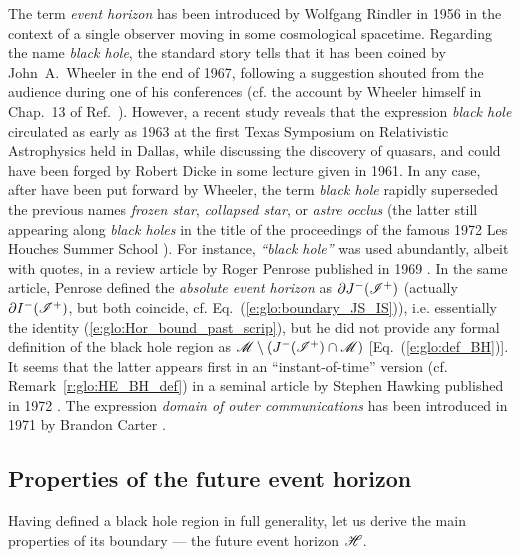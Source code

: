 \begin{hist} \label{h:glo:black_hole_name}
The term \emph{event horizon} has been introduced by Wolfgang Rindler in 1956 \cite{Rindl56}
in the context of a single observer moving in some cosmological spacetime.
Regarding the name \emph{black hole}, the standard
story tells that it has been coined by John~A.~Wheeler in the end of 1967,
following a suggestion shouted from the audience during one of his conferences
(cf. the account by Wheeler himself in Chap.~13 of Ref.~\cite{Wheel98}).
However, a recent study \cite{HerdeL18} reveals that the expression \emph{black hole}
circulated as early as 1963 at the first Texas Symposium on Relativistic Astrophysics
held in Dallas,
while discussing the discovery of quasars, and could have been forged by
Robert Dicke in some lecture given in 1961.
In any case, after have been put forward by Wheeler,
the term \emph{black hole} rapidly superseded the previous names
\emph{frozen star}, \emph{collapsed star}, or \emph{astre occlus}
(the latter still appearing along \emph{black holes} in the title of
the proceedings of the famous 1972 Les Houches Summer School \cite{DeWit73}).
For instance, \emph{``black hole''} was used abundantly, albeit with
quotes, in a review article by Roger Penrose published
in 1969 \cite{Penro69}. In the same article, Penrose defined the \emph{absolute event horizon}
as $\partial J^-(\mathscr{I}^+)$ (actually $\partial I^-(\mathscr{I}^+)$, but both coincide, cf.
Eq.~(\ref{e:glo:boundary_JS_IS})), i.e. essentially the identity (\ref{e:glo:Hor_bound_past_scrip}), but he did not provide any formal definition of the
black hole region as $ \mathscr{M} \setminus (J^-(\mathscr{I}^+)\cap\mathscr{M})$ [Eq.~(\ref{e:glo:def_BH})].
It seems that the latter appears first in an ``instant-of-time'' version
(cf. Remark~\ref{r:glo:HE_BH_def}) in a seminal article by Stephen Hawking published in 1972 \cite{Hawki72}.
The expression \emph{domain of outer communications} has been introduced in 1971 by
Brandon Carter \cite{Carte71}.
\end{hist}


\subsection{Properties of the future event horizon} \label{s:glo:properties_H}

Having defined a black hole region in full generality, let us derive the
main properties of its boundary --- the future event horizon $\mathscr{H}$.



